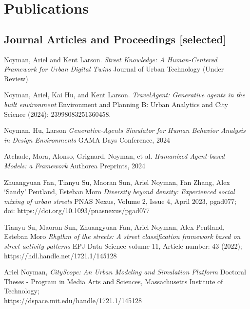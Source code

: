 \section*{Publications}

\subsection*{Journal Articles and Proceedings [selected]}

\begin{tablist}

    \item[`25] \tab
    Noyman, Ariel and Kent Larson.
    \textit{Street Knowledge: A Human-Centered Framework for Urban Digital Twins}
    Journal of Urban Technology (Under Review).


    \item[`25] \tab
    Noyman, Ariel, Kai Hu, and Kent Larson.
    \textit{TravelAgent: Generative agents in the built environment}
    Environment and Planning B: Urban Analytics and City Science (2024): 23998083251360458.

    \item[`24] \tab
    Noyman, Hu, Larson
    \textit{Generative-Agents Simulator for Human Behavior Analysis in Design Environments}
    GAMA Days Conference, 2024

    \item[`24] \tab
    Atchade, Mora, Alonso, Grignard, Noyman, et al.
    \textit{Humanized Agent-based Models: a Framework}
    Authorea Preprints, 2024


    \item[`23] \tab
    Zhuangyuan Fan, Tianyu Su, Maoran Sun, Ariel Noyman, Fan Zhang, Alex ‘Sandy’ Pentland, Esteban Moro
    \textit{Diversity beyond density: Experienced social mixing of urban streets}
    PNAS Nexus, Volume 2, Issue 4, April 2023, pgad077; doi: https://doi.org/10.1093/pnasnexus/pgad077

    \item[`22] \tab
    Tianyu Su, Maoran Sun, Zhuangyuan Fan, Ariel Noyman, Alex Pentland, Esteban Moro
    \textit{Rhythm of the streets: A street classification framework based on street activity patterns}
    EPJ Data Science volume 11, Article number: 43 (2022); https://hdl.handle.net/1721.1/145128


    \item[`22] \tab
    Ariel Noyman,
    \textit{CityScope: An Urban Modeling and Simulation Platform}
    Doctoral Theses - Program in Media Arts and Sciences,
    Massachusetts Institute of Technology; \\https://dspace.mit.edu/handle/1721.1/145128


\end{tablist}
